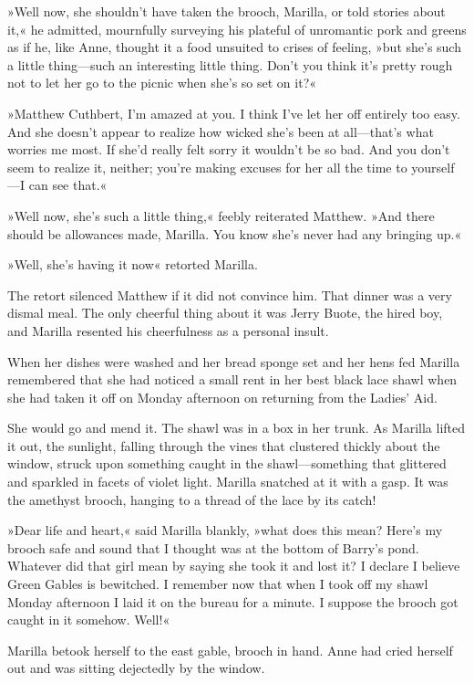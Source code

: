 »Well now, she shouldn't have taken the brooch, Marilla, or told stories about it,« he admitted, mournfully surveying his plateful of unromantic pork and greens as if he, like Anne, thought it a food unsuited to crises of feeling, »but she's such a little thing—such an interesting little thing. Don't you think it's pretty rough not to let her go to the picnic when she's so set on it?«

»Matthew Cuthbert, I'm amazed at you. I think I've let her off entirely too easy. And she doesn't appear to realize how wicked she's been at all—that's what worries me most. If she'd really felt sorry it wouldn't be so bad. And you don't seem to realize it, neither; you're making excuses for her all the time to yourself—I can see that.«

»Well now, she's such a little thing,« feebly reiterated Matthew. »And there should be allowances made, Marilla. You know she's never had any bringing up.«

»Well, she's having it now« retorted Marilla.

The retort silenced Matthew if it did not convince him. That dinner was a very dismal meal. The only cheerful thing about it was Jerry Buote, the hired boy, and Marilla resented his cheerfulness as a personal insult.

When her dishes were washed and her bread sponge set and her hens fed Marilla remembered that she had noticed a small rent in her best black lace shawl when she had taken it off on Monday afternoon on returning from the Ladies' Aid.

She would go and mend it. The shawl was in a box in her trunk. As Marilla lifted it out, the sunlight, falling through the vines that clustered thickly about the window, struck upon something caught in the shawl—something that glittered and sparkled in facets of violet light. Marilla snatched at it with a gasp. It was the amethyst brooch, hanging to a thread of the lace by its catch!

»Dear life and heart,« said Marilla blankly, »what does this mean? Here's my brooch safe and sound that I thought was at the bottom of Barry's pond. Whatever did that girl mean by saying she took it and lost it? I declare I believe Green Gables is bewitched. I remember now that when I took off my shawl Monday afternoon I laid it on the bureau for a minute. I suppose the brooch got caught in it somehow. Well!«

Marilla betook herself to the east gable, brooch in hand. Anne had cried herself out and was sitting dejectedly by the window.

